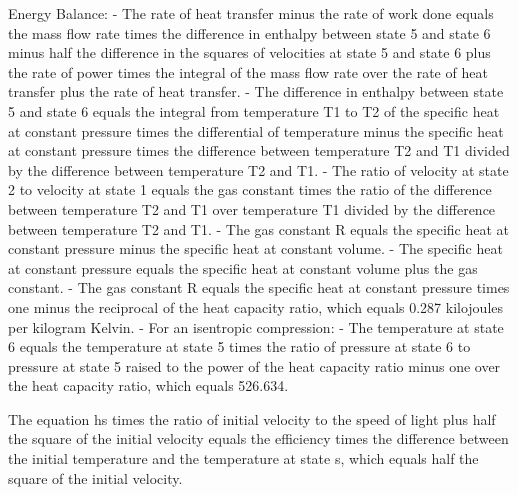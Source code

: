 Energy Balance:
- The rate of heat transfer minus the rate of work done equals the mass flow rate times the difference in enthalpy between state 5 and state 6 minus half the difference in the squares of velocities at state 5 and state 6 plus the rate of power times the integral of the mass flow rate over the rate of heat transfer plus the rate of heat transfer.
- The difference in enthalpy between state 5 and state 6 equals the integral from temperature T1 to T2 of the specific heat at constant pressure times the differential of temperature minus the specific heat at constant pressure times the difference between temperature T2 and T1 divided by the difference between temperature T2 and T1.
- The ratio of velocity at state 2 to velocity at state 1 equals the gas constant times the ratio of the difference between temperature T2 and T1 over temperature T1 divided by the difference between temperature T2 and T1.
- The gas constant R equals the specific heat at constant pressure minus the specific heat at constant volume.
- The specific heat at constant pressure equals the specific heat at constant volume plus the gas constant.
- The gas constant R equals the specific heat at constant pressure times one minus the reciprocal of the heat capacity ratio, which equals 0.287 kilojoules per kilogram Kelvin.
- For an isentropic compression:
- The temperature at state 6 equals the temperature at state 5 times the ratio of pressure at state 6 to pressure at state 5 raised to the power of the heat capacity ratio minus one over the heat capacity ratio, which equals 526.634.

The equation hs times the ratio of initial velocity to the speed of light plus half the square of the initial velocity equals the efficiency times the difference between the initial temperature and the temperature at state s, which equals half the square of the initial velocity.